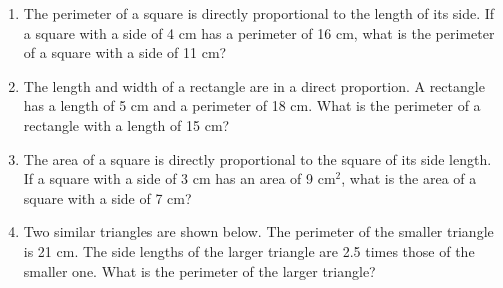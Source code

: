 \documentclass[12pt]{article}
\begin{document}
\begin{enumerate}[resume]
    \item The perimeter of a square is directly proportional to the length of its side. If a square with a side of 4 cm has a perimeter of 16 cm, what is the perimeter of a square with a side of 11 cm?
    \vspace{1.2cm}

    \item The length and width of a rectangle are in a direct proportion. A rectangle has a length of 5 cm and a perimeter of 18 cm. What is the perimeter of a rectangle with a length of 15 cm?\\

    \begin{center}
    \end{center}
    
    \vspace{1.2cm}

    \item The area of a square is directly proportional to the square of its side length. If a square with a side of 3 cm has an area of 9 cm$^2$, what is the area of a square with a side of 7 cm?
    \vspace{1.2cm}

    \item Two similar triangles are shown below. The perimeter of the smaller triangle is 21 cm. The side lengths of the larger triangle are 2.5 times those of the smaller one. What is the perimeter of the larger triangle?\\

    \begin{center}
        
    \end{center}
    

\end{enumerate}
\end{document}
